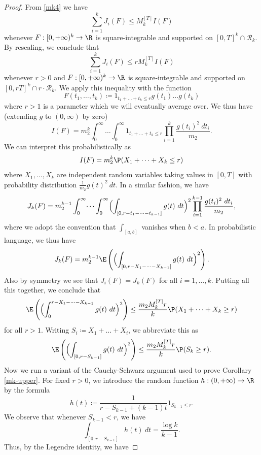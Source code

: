 \begin{proof}  From \eqref{mk4} we have
$$ \sum_{i=1}^k J_i(F) \leq M_k^{[T]} I(F)$$
whenever $F: [0,+\infty)^k \to \R$ is square-integrable and supported on $[0,T]^k \cap {\mathcal R}_k$.  By rescaling, we conclude that
$$ \sum_{i=1}^k J_i(F) \leq r M_k^{[T]} I(F)$$
whenever $r>0$ and $F: [0,+\infty)^k \to \R$ is square-integrable and supported on $[0,rT]^k \cap r \cdot {\mathcal R}_k$.  We apply this inequality with the function
$$ F(t_1,\dots,t_k) \coloneqq 1_{t_1+\dots+t_k \leq r} g(t_1) \dots g(t_k)$$
where $r>1$ is a parameter which we will eventually average over.  We thus have (extending $g$ to $(0,\infty)$ by zero)
$$ I(F) = m_2^k \int_0^\infty \dots \int_0^\infty 1_{t_1+\dots+t_k \leq r} \prod_{i=1}^k \frac{g(t_i)^2\ dt_i}{m_2}.$$
We can interpret this probabilistically as
$$ I(F) = m_2^k \P( X_1 + \dots + X_k \leq r )$$
where $X_1,\dots,X_k$ are independent random variables taking values in $[0,T]$ with probability distribution $\frac{1}{m_2} g(t)^2\ dt$.  In a similar fashion, we have
$$ J_k(F) = m_2^{k-1} \int_0^\infty \dots \int_0^\infty \Bigl(\int_{[0,r-t_1-\dots-t_{k-1}]} g(t)\ dt\Bigr)^2 \prod_{i=1}^{k-1} \frac{g(t_i)^2\ dt_i}{m_2},$$
where we adopt the convention that $\int_{[a,b]}$ vanishes when $b<a$.  In probabilistic language, we thus have
$$ J_k(F) = m_2^{k-1} \E \left(\Bigl(\int_{[0,r-X_1-\dots-X_{k-1}]} g(t)\ dt\Bigr)^2\right).$$
Also by symmetry we see that $J_i(F)=J_k(F)$ for all $i=1,\dots,k$.  Putting all this together, we conclude that
$$\E \left(\Bigl(\int_0^{r-X_1-\dots-X_{k-1}} g(t)\ dt\Bigr)^2\right) \leq \frac{m_2 M^{[T]}_k r}{k} \P( X_1 + \dots + X_k \geq r )$$
for all $r>1$.  Writing $S_i \coloneqq X_1 + \dots + X_i$, we abbreviate this as
\begin{equation}\label{rg1}
\E \left(\Bigl(\int_{[0,r-S_{k-1}]} g(t)\ dt\Bigr)^2\right) \leq \frac{m_2 M_k^{[T]} r}{k} \P( S_k \geq r ).
\end{equation}
Now we run a variant of the Cauchy-Schwarz argument used to prove Corollary \ref{mk-upper}.  For fixed $r>0$, we introduce the random function $h: (0,+\infty) \to \R$ by the formula
\begin{equation}\label{hdef}
 h(t) \coloneqq \frac{1}{r-S_{k-1}+(k-1)t} 1_{S_{k-1} \leq r}.
\end{equation}
We observe that whenever $S_{k-1} < r$, we have
\begin{equation}\label{h-int}
 \int_{[0,r-S_{k-1}]} h(t)\ dt = \frac{\log k}{k-1}.
\end{equation}
Thus, by the Legendre identity, we have

\end{proof}
